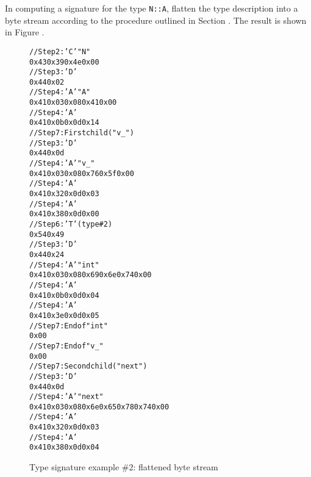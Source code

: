 In computing a signature for the type \texttt{N::A}, flatten the type
description into a byte stream according to the procedure
outlined in 
Section .
The result is shown in 
Figure .

\begin{figure}
\begin{dwflisting}
\begin{alltt}
// Step 2: 'C' \DWTAGnamespace "N"
0x43 0x39 0x4e 0x00
// Step 3: 'D' \DWTAGclasstype
0x44 0x02
// Step 4: 'A' \DWATname \DWFORMstring "A"
0x41 0x03 0x08 0x41 0x00
// Step 4: 'A' \DWATbytesize {}
0x41 0x0b 0x0d 0x14
// Step 7: First child ("v\_")
    // Step 3: 'D' \DWTAGmember
    0x44 0x0d
    // Step 4: 'A' \DWATname \DWFORMstring "v\_"
    0x41 0x03 0x08 0x76 0x5f 0x00
    // Step 4: 'A' \DWATaccessibility \DWFORMsdata \DWACCESSprivate
    0x41 0x32 0x0d 0x03
    // Step 4: 'A' \DWATdatamemberlocation {}
    0x41 0x38 0x0d 0x00
    // Step 6: 'T' \DWATtype (type \#2)
    0x54 0x49
        // Step 3: 'D' \DWTAGbasetype
        0x44 0x24
        // Step 4: 'A' \DWATname \DWFORMstring "int"
        0x41 0x03 0x08 0x69 0x6e 0x74 0x00
        // Step 4: 'A' \DWATbytesize {}
        0x41 0x0b 0x0d 0x04
        // Step 4: 'A' \DWATencoding \DWFORMsdata \DWATEsigned
        0x41 0x3e 0x0d 0x05
        // Step 7: End of \DWTAGbasetype "int"
        0x00
    // Step 7: End of \DWTAGmember "v\_"
    0x00
// Step 7: Second child ("next")
    // Step 3: 'D' \DWTAGmember
    0x44 0x0d
    // Step 4: 'A' \DWATname \DWFORMstring "next"
    0x41 0x03 0x08 0x6e 0x65 0x78 0x74 0x00
    // Step 4: 'A' \DWATaccessibility \DWFORMsdata \DWACCESSprivate
    0x41 0x32 0x0d 0x03
    // Step 4: 'A' \DWATdatamemberlocation {}
    0x41 0x38 0x0d 0x04
\end{alltt}
\end{dwflisting}
\caption{Type signature example \#2: flattened byte stream}
\label{fig:typesignatureexample2flattenedbytestream}
\end{figure}

